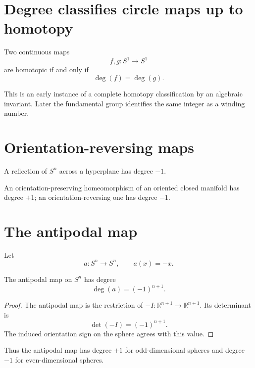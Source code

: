 \section{Degree classifies circle maps up to homotopy}

\begin{theorem}
\label{thm:viii03-circle-classification}
Two continuous maps
\[
f,g:S^1\to S^1
\]
are homotopic if and only if
\[
\deg(f)=\deg(g).
\]
\end{theorem}

This is an early instance of a complete homotopy classification by an algebraic
invariant.  Later the fundamental group identifies the same integer as a
winding number.

\section{Orientation-reversing maps}

\begin{proposition}[Reflection]
\label{prop:viii03-reflection}
A reflection of \(S^n\) across a hyperplane has degree \(-1\).
\end{proposition}

\begin{proposition}
\label{prop:viii03-homeomorphism}
An orientation-preserving homeomorphism of an oriented closed manifold has
degree \(+1\); an orientation-reversing one has degree \(-1\).
\end{proposition}

\section{The antipodal map}

Let
\[
a:S^n\to S^n,
\qquad
a(x)=-x.
\]

\begin{theorem}
\label{thm:viii03-antipodal}
The antipodal map on \(S^n\) has degree
\[
\deg(a)=(-1)^{n+1}.
\]
\end{theorem}

\begin{proof}
The antipodal map is the restriction of \(-I:\mathbb R^{n+1}\to\mathbb R^{n+1}\).
Its determinant is
\[
\det(-I)=(-1)^{n+1}.
\]
The induced orientation sign on the sphere agrees with this value.
\end{proof}

Thus the antipodal map has degree \(+1\) for odd-dimensional spheres and
degree \(-1\) for even-dimensional spheres.

